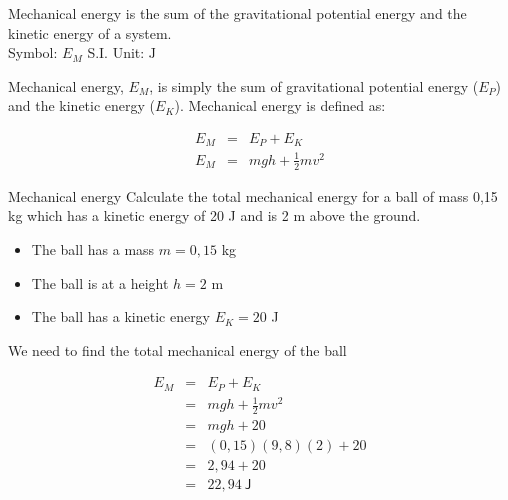  {Mechanical energy is the sum of the gravitational potential energy and the kinetic energy of a system.\\
 Symbol: $E_{M}$ \hspace{2cm} S.I. Unit: $\text{J}$ } 

\label{m38786*id68299}Mechanical energy, ${E}_{M}$, is simply the sum of gravitational potential energy (${E}_{P}$) and the kinetic energy (${E}_{K}$). Mechanical energy is defined as:\par 

\begin{eqnarray*}
E_{M} &=& E_P + E_K \\
E_{M} &=& mgh + \frac{1}{2}mv^2
\end{eqnarray*}

      \label{m38786*uid78}
            
\begin{wex}{Mechanical energy}
{Calculate the total mechanical energy for a ball of mass 0,15 kg which has a kinetic energy of 20 J and is 2 m above the ground.
}
{
\begin{itemize}
\item The ball has a mass $m = 0,15$ kg
\item The ball is at a height $h = 2$ m
\item The ball has a kinetic energy $E_K = 20$ J
\end{itemize}

We need to find the total mechanical energy of the ball

\begin{eqnarray*}
E_M &=& E_P + E_K \\
&=& mgh + \frac{1}{2}mv^2 \\
&=& mgh + 20 \\
&=& (0,15)(9,8)(2) + 20 \\
&=& 2,94 + 20 \\
&=& 22,94 \ \mathsf{J}
\end{eqnarray*}

}
\end{wex}


